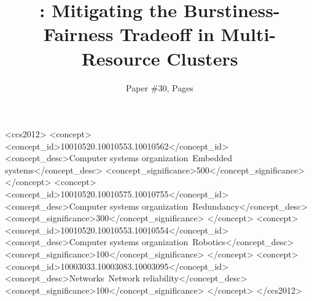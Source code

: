 \documentclass[sigconf]{acmart}
\begin{document}
\title{\name: Mitigating the Burstiness-Fairness Tradeoff in Multi-Resource Clusters}

\author{Paper \#30, {\pageref{EndOfPaper} Pages}}



\begin{abstract}

\end{abstract}

%
%
\begin{CCSXML}
<ccs2012>
 <concept>
  <concept_id>10010520.10010553.10010562</concept_id>
  <concept_desc>Computer systems organization~Embedded systems</concept_desc>
  <concept_significance>500</concept_significance>
 </concept>
 <concept>
  <concept_id>10010520.10010575.10010755</concept_id>
  <concept_desc>Computer systems organization~Redundancy</concept_desc>
  <concept_significance>300</concept_significance>
 </concept>
 <concept>
  <concept_id>10010520.10010553.10010554</concept_id>
  <concept_desc>Computer systems organization~Robotics</concept_desc>
  <concept_significance>100</concept_significance>
 </concept>
 <concept>
  <concept_id>10003033.10003083.10003095</concept_id>
  <concept_desc>Networks~Network reliability</concept_desc>
  <concept_significance>100</concept_significance>
 </concept>
</ccs2012>  
\end{CCSXML}






\maketitle
\end{document}
